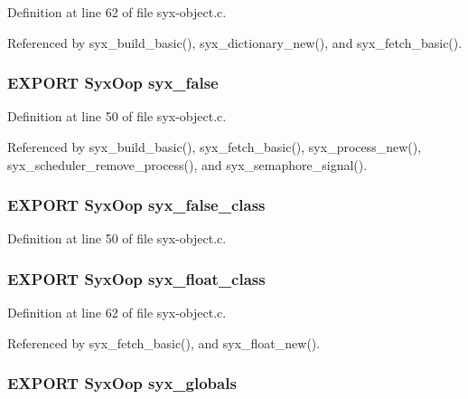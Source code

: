 Definition at line 62 of file syx-object.c.

Referenced by syx\_\-build\_\-basic(), syx\_\-dictionary\_\-new(), and syx\_\-fetch\_\-basic().\hypertarget{syx-object_8h_d3170f4cecf092ffa04e6f55351d12d0}{
\subsubsection{\setlength{\rightskip}{0pt plus 5cm}EXPORT {\bf SyxOop} {\bf syx\_\-false}}}
\label{syx-object_8h_d3170f4cecf092ffa04e6f55351d12d0}




Definition at line 50 of file syx-object.c.

Referenced by syx\_\-build\_\-basic(), syx\_\-fetch\_\-basic(), syx\_\-process\_\-new(), syx\_\-scheduler\_\-remove\_\-process(), and syx\_\-semaphore\_\-signal().\hypertarget{syx-object_8h_6bb55cfd100e1c3614b1a4f941c22f9d}{
\subsubsection{\setlength{\rightskip}{0pt plus 5cm}EXPORT {\bf SyxOop} {\bf syx\_\-false\_\-class}}}
\label{syx-object_8h_6bb55cfd100e1c3614b1a4f941c22f9d}




Definition at line 50 of file syx-object.c.\hypertarget{syx-object_8h_a99406e5776ba4d5b8584c9dba551379}{
\subsubsection{\setlength{\rightskip}{0pt plus 5cm}EXPORT {\bf SyxOop} {\bf syx\_\-float\_\-class}}}
\label{syx-object_8h_a99406e5776ba4d5b8584c9dba551379}




Definition at line 62 of file syx-object.c.

Referenced by syx\_\-fetch\_\-basic(), and syx\_\-float\_\-new().\hypertarget{syx-object_8h_c285844af2007d5ac653de1a0dfb7524}{
\subsubsection{\setlength{\rightskip}{0pt plus 5cm}EXPORT {\bf SyxOop} {\bf syx\_\-globals}}}
\label{syx-object_8h_c285844af2007d5ac653de1a0dfb7524}




